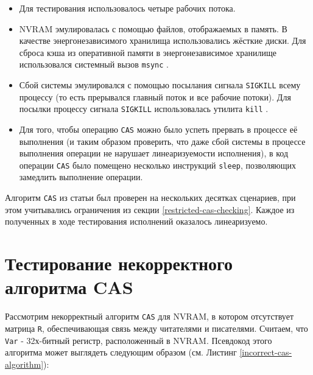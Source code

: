 \documentclass[times,specification,annotation]{itmo-student-thesis}
\begin{document}
\begin{itemize}
    \item Для тестирования использовалось четыре рабочих потока.
    
    \item NVRAM эмулировалась с помощью файлов, отображаемых в память. В качестве энергонезависимого хранилища использовались жёсткие диски. Для сброса кэша из оперативной памяти в энергонезависимое хранилище использовался системный вызов \texttt{msync} \cite{msync}.
    
    \item Сбой системы эмулировался с помощью посылания сигнала \texttt{SIGKILL} всему процессу (то есть прерывался главный поток и все рабочие потоки). Для посылки процессу сигнала \texttt{SIGKILL} использовалась утилита \texttt{kill} \cite{kill}.
    
    \item Для того, чтобы операцию \texttt{CAS} можно было успеть прервать в процессе её выполнения (и таким образом проверить, что даже сбой системы в процессе выполнения операции не нарушает линеаризуемости исполнения), в код операции \texttt{CAS} было помещено несколько инструкций \texttt{sleep}, позволяющих замедлить выполнение операции. 
\end{itemize}

\bigbreak

Алгоритм \texttt{CAS} из статьи \cite{attiya2018nesting} был проверен на нескольких десятках сценариев, при этом учитывались ограничения из секции \ref{restricted-cas-checking}. Каждое из полученных в ходе тестирования исполнений оказалось линеаризуемо.

\section{Тестирование некорректного алгоритма CAS}

Рассмотрим некорректный алгоритм \texttt{CAS} для NVRAM, в котором отсутствует матрица \texttt{R}, обеспечивающая связь между читателями и писателями. Считаем, что \texttt{Var} - 32х-битный регистр, расположенный в NVRAM. Псевдокод этого алгоритма может выглядеть следующим образом (см. Листинг \ref{incorrect-cas-algorithm}): 
\end{document}
